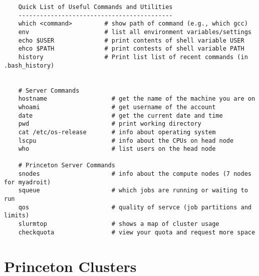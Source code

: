 \documentclass[12pt]{article}
\theoremstyle{plain}
\theoremstyle{definition}
\theoremstyle{remark}
\begin{document}
\begin{lstlisting}
    Quick List of Useful Commands and Utilities
    -------------------------------------------
    which <command>         # show path of command (e.g., which gcc)
    env                     # list all environment variables/settings
    echo $USER              # print contents of shell variable USER
    ehco $PATH              # print contests of shell variable PATH
    history                 # Print list list of recent commands (in .bash_history)


    # Server Commands
    hostname                  # get the name of the machine you are on
    whoami                    # get username of the account
    date                      # get the current date and time
    pwd                       # print working directory
    cat /etc/os-release       # info about operating system
    lscpu                     # info about the CPUs on head node
    who                       # list users on the head node

    # Princeton Server Commands
    snodes                    # info about the compute nodes (7 nodes for myadroit)
    squeue                    # which jobs are running or waiting to run
    qos                       # quality of servce (job partitions and limits)
    slurmtop                  # shows a map of cluster usage
    checkquota                # view your quota and request more space
\end{lstlisting}



\clearpage
\appendix
\section{Princeton Clusters}
\end{document}
